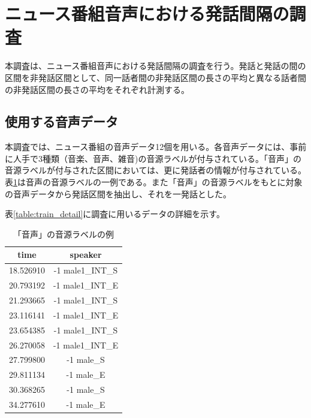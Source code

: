 \section{ニュース番組音声における発話間隔の調査}
\label{section:research_news}
本調査は、ニュース番組音声における発話間隔の調査を行う。発話と発話の間の区間を非発話区間として、同一話者間の非発話区間の長さの平均と異なる話者間の非発話区間の長さの平均をそれぞれ計測する。

\subsection{使用する音声データ}
\label{section:detail_train_news}
本調査では、ニュース番組の音声データ12個を用いる。各音声データには、事前に人手で3種類（音楽、音声、雑音)の音源ラベルが付与されている。「音声」の音源ラベルが付与された区間においては、更に発話者の情報が付与されている。表\ref{fig:example_label}は音声の音源ラベルの一例である。また「音声」の音源ラベルをもとに対象の音声データから発話区間を抽出し、それを一発話とした。\par
表\ref{table:train_detail}に調査に用いるデータの詳細を示す。\vspace{0.2in}

\begin{table}[H]
\begin{center}
\caption{「音声」の音源ラベルの例 \label{fig:example_label}}
\begin{tabular}{|c|c|}
\hline
time      & speaker          \\ \hline
18.526910 & -1 male1\_INT\_S \\ \hline
20.793192 & -1 male1\_INT\_E \\ \hline
21.293665 & -1 male1\_INT\_S \\ \hline
23.116141 & -1 male1\_INT\_E \\ \hline
23.654385 & -1 male1\_INT\_S \\ \hline
26.270058 & -1 male1\_INT\_E \\ \hline
27.799800 & -1 male\_S       \\ \hline
29.811134 & -1 male\_E       \\ \hline
30.368265 & -1 male\_S       \\ \hline
34.277610 & -1 male\_E       \\ \hline
\end{tabular}
\end{center}
\end{table}

